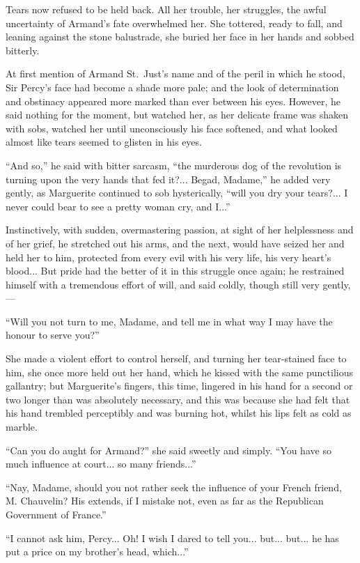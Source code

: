 \documentclass[paper=a5,BCOR=7mm,twoside,DIV=calc,12pt,usegeometry,chapterprefix,endperiod,headings=big]{scrbook}
\begin{document}
Tears now refused to be held back. All her trouble, her struggles, the awful uncertainty of Armand's fate overwhelmed her. She tottered, ready to fall, and leaning against the stone balustrade, she buried her face in her hands and sobbed bitterly.

At first mention of Armand St.~Just's name and of the peril in which he stood, Sir Percy's face had become a shade more pale; and the look of determination and obstinacy appeared more marked than ever between his eyes. However, he said nothing for the moment, but watched her, as her delicate frame was shaken with sobs, watched her until unconsciously his face softened, and what looked almost like tears seemed to glisten in his eyes.

\enquote{And so,} he said with bitter sarcasm, \enquote{the murderous dog of the revolution is turning upon the very hands that fed it?... Begad, Madame,} he added very gently, as Marguerite continued to sob hysterically, \enquote{will you dry your tears?... I never could bear to see a pretty woman cry, and I...}

Instinctively, with sudden, overmastering passion, at sight of her helplessness and of her grief, he stretched out his arms, and the next, would have seized her and held her to him, protected from every evil with his very life, his very heart's blood... But pride had the better of it in this struggle once again; he restrained himself with a tremendous effort of will, and said coldly, though still very gently,---

\enquote{Will you not turn to me, Madame, and tell me in what way I may have the honour to serve you?}

She made a violent effort to control herself, and turning her tear-stained face to him, she once more held out her hand, which he kissed with the same punctilious gallantry; but Marguerite's fingers, this time, lingered in his hand for a second or two longer than was absolutely necessary, and this was because she had felt that his hand trembled perceptibly and was burning hot, whilst his lips felt as cold as marble.

\enquote{Can you do aught for Armand?} she said sweetly and simply. \enquote{You have so much influence at court... so many friends...}

\enquote{Nay, Madame, should you not rather seek the influence of your French friend, M. Chauvelin? His extends, if I mistake not, even as far as the Republican Government of France.}

\enquote{I cannot ask him, Percy... Oh! I wish I dared to tell you... but... but... he has put a price on my brother's head, which...}
\end{document}
